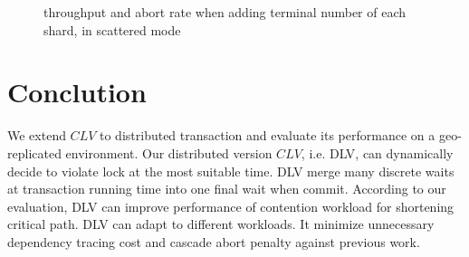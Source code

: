 \documentclass[conference]{IEEEtran}
\begin{document}
\begin{figure}[htbp]
  \centering

\caption{throughput and abort rate when adding terminal number of each shard, in scattered mode}
\label{fig:plot_ycsb_add_Theta_Theta_TPM_gather}
\end{figure}


\section{Conclution}
\label{sec:conclution}
We extend $CLV$ to distributed transaction and evaluate its performance on a geo-replicated environment.
Our distributed version ${CLV}$, i.e. DLV, can dynamically decide to violate lock at the most suitable time.
DLV merge many discrete waits at transaction running time into one final wait when commit.
According to our evaluation, DLV can improve performance of contention workload for shortening critical path.
DLV can adapt to different workloads.
It minimize unnecessary dependency tracing cost and cascade abort penalty against previous work.








\end{document}
